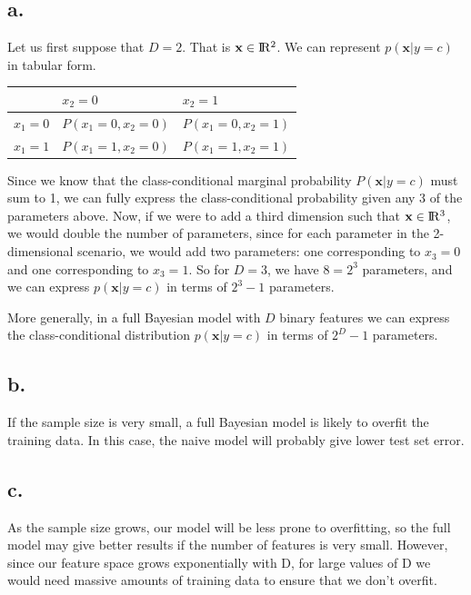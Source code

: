 \documentclass{article}
\begin{document}
\subsection{a.}

Let us first suppose that $D = 2$. That is $\mathbf{x} \in \rm I\!R^2$.
We can represent $p(\mathbf{x}|y=c)$ in tabular form.

\begin{tabular}{ |l|l|l| }
\hline
        & $x_2=0$              & $x_2=1$             \\ \hline 
$x_1=0$ & $P(x_1=0, x_2=0)$ & $P(x_1=0, x_2=1)$ \\ \hline 
$x_1=1$ & $P(x_1=1, x_2=0)$ & $P(x_1=1, x_2=1)$ \\
\hline
\end{tabular}

Since we know that the class-conditional marginal probability
$P(\mathbf{x}|y=c)$ must sum to 1, we can fully express the
class-conditional probability given any 3 of the parameters above.
Now, if we were to add a third dimension such that
$\mathbf{x} \in \rm I\!R^3$, we would double the number of parameters,
since for each parameter in the 2-dimensional scenario, we would add
two parameters: one corresponding to $x_3 = 0$ and one corresponding
to $x_3 = 1$. So for $D = 3$, we have $8 = 2^3$ parameters, and we can
express $p(\mathbf{x}|y=c)$ in terms of $2^3 - 1$ parameters.

More generally, in a full Bayesian model with $D$ binary features we
can express the class-conditional distribution $p(\mathbf{x}|y=c)$ in
terms of $2^D - 1$ parameters.

\subsection{b.}

If the sample size is very small, a full Bayesian model is likely to
overfit the training data. In this case, the naive model will probably
give lower test set error.

\subsection{c.}

As the sample size grows, our model will be less prone to overfitting,
so the full model may give better results if the number of features is
very small. However, since our feature space grows exponentially with
D, for large values of D we would need massive amounts of training
data to ensure that we don't overfit.
\end{document}
